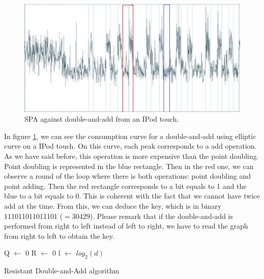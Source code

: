 \documentclass[journal]{IEEEtran}
\begin{document}
\begin{figure}[h]
   \includegraphics[scale=0.65]{spa.png}
   \caption{\label{spa.png} SPA against double-and-add from an IPod touch.}
\end{figure}

In figure \ref{spa.png}, we can see the consumption curve for a double-and-add using elliptic curve on a IPod touch. On this curve, each peak corresponds to a add operation. As we have said before, this operation is more expensive than the point doubling. Point doubling is represented in the blue rectangle. Then in the red one, we can observe a round of the loop where there is both operations: point doubling and point adding. Then the red rectangle corresponds to a bit equals to 1 and the blue to a bit equals to 0. This is coherent with the fact that we cannot have twice add at the time. From this, we can deduce the key, which is in binary 111011011011101 ($=30429$). Please remark that if the double-and-add is performed from right to left instead of left to right, we have to read the graph from right to left to obtain the key.

\begin{algorithm}
    \SetAlgoLined %
   
    \SetSideCommentLeft 
    \SetNoFillComment

    
    
    Q $\leftarrow$ 0\;
    R $\leftarrow$ 0\;
    l $\leftarrow$ $log_2(d)$\;

    \bigskip

    \caption{Resistant Double-and-Add algorithm}
    \label{resistent-daa}
\end{algorithm}
\end{document}
